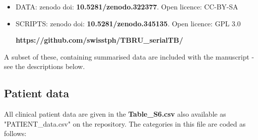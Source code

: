 \documentclass[12pt, oneside]{article}   	%
\begin{document}
\begin{itemize}
  \item DATA: zenodo doi: \textbf{10.5281/zenodo.322377}. Open licence: CC-BY-SA
  \item SCRIPTS: zenodo doi: \textbf{10.5281/zenodo.345135}. Open licence: GPL 3.0

  \textbf{https://github.com/swisstph/TBRU\_serialTB/}
\end{itemize}

\noindent A subset of these, containing summarised data are included with the manuscript - see the descriptions below.

\subsection{Patient data}
All clinical patient data are given in the \textbf{Table\_S6.csv} also available as "PATIENT\_data.csv" on the repository.
The categories in this file are coded as follows:
\end{document}

